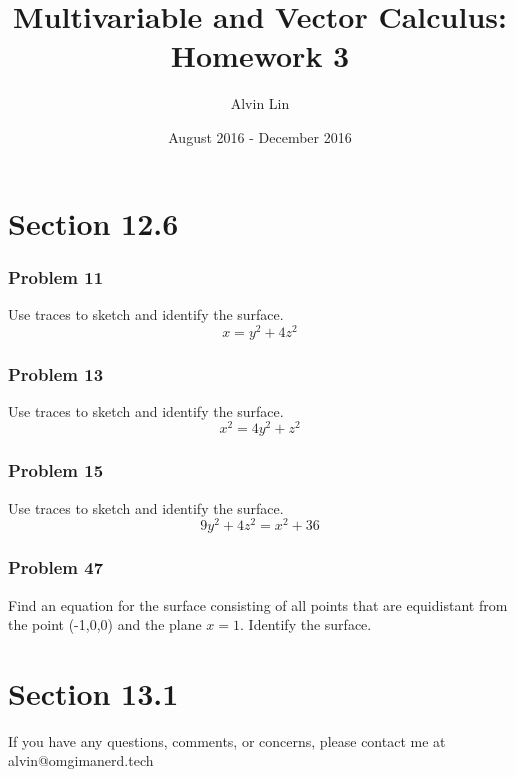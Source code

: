 \documentclass[letterpaper, 12pt]{math}
\title{Multivariable and Vector Calculus: Homework 3}
\author{Alvin Lin}
\date{August 2016 - December 2016}
\begin{document}
\maketitle

\section*{Section 12.6}

\subsubsection*{Problem 11}
Use traces to sketch and identify the surface.
\[ x = y^2+4z^2 \]

\subsubsection*{Problem 13}
Use traces to sketch and identify the surface.
\[ x^2 = 4y^2+z^2 \]

\subsubsection*{Problem 15}
Use traces to sketch and identify the surface.
\[ 9y^2+4z^2 = x^2+36 \]

\subsubsection*{Problem 47}
Find an equation for the surface consisting of all points that are
equidistant from the point (-1,0,0) and the plane \( x = 1 \). Identify the
surface.

\section*{Section 13.1}

\begin{center}
  If you have any questions, comments, or concerns, please contact me at
  alvin@omgimanerd.tech
\end{center}
\end{document}
